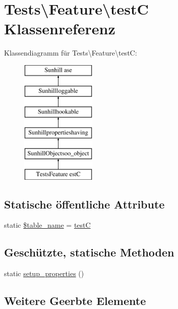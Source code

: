 \hypertarget{classTests_1_1Feature_1_1testC}{}\section{Tests\textbackslash{}Feature\textbackslash{}testC Klassenreferenz}
\label{classTests_1_1Feature_1_1testC}
Klassendiagramm für Tests\textbackslash{}Feature\textbackslash{}testC\+:\begin{figure}[H]
\begin{center}
\leavevmode
\includegraphics[height=6.000000cm]{d9/da3/classTests_1_1Feature_1_1testC}
\end{center}
\end{figure}
\subsection*{Statische öffentliche Attribute}
\begin{DoxyCompactItemize}
\item 
static \hyperlink{classTests_1_1Feature_1_1testC_ae9c7cd31737cf27338fb2d0bb891e4fb}{\$table\+\_\+name} = \textquotesingle{}\hyperlink{classTests_1_1Feature_1_1testC}{testC}\textquotesingle{}
\end{DoxyCompactItemize}
\subsection*{Geschützte, statische Methoden}
\begin{DoxyCompactItemize}
\item 
static \hyperlink{classTests_1_1Feature_1_1testC_a07484cdd66c048306312c0f61fe28d86}{setup\+\_\+properties} ()
\end{DoxyCompactItemize}
\subsection*{Weitere Geerbte Elemente}


